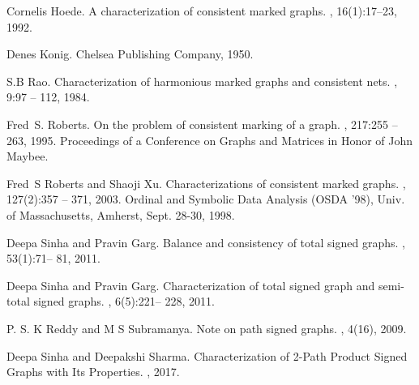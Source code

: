 \documentclass[12pt, a4paper]{report}
\theoremstyle{fordefn}
\begin{document}
\begin{thebibliography}{10}
Cornelis Hoede.
\newblock A characterization of consistent marked graphs.
, 16(1):17--23, 1992.

Denes Konig.
\newblock Chelsea Publishing Company, 1950.

S.B Rao.
\newblock Characterization of harmonious marked graphs and consistent nets.
,
  9:97 -- 112, 1984.

Fred~S. Roberts.
\newblock On the problem of consistent marking of a graph.
, 217:255 -- 263, 1995.
\newblock Proceedings of a Conference on Graphs and Matrices in Honor of John
  Maybee.

Fred~S Roberts and Shaoji Xu.
\newblock Characterizations of consistent marked graphs.
, 127(2):357 -- 371, 2003.
\newblock Ordinal and Symbolic Data Analysis (OSDA '98), Univ. of
  Massachusetts, Amherst, Sept. 28-30, 1998.

Deepa Sinha and Pravin Garg.
\newblock Balance and consistency of total signed graphs.
, 53(1):71-- 81, 2011.

Deepa Sinha and Pravin Garg.
\newblock Characterization of total signed graph and semi-total signed graphs.
,
  6(5):221-- 228, 2011.
  
P. S. K Reddy and M S Subramanya.
\newblock Note on path signed graphs.
,
  4(16), 2009.
  
Deepa Sinha and Deepakshi Sharma.
\newblock Characterization of 2-Path Product Signed Graphs with
Its Properties.
,
  2017.


\end{thebibliography}
\end{document}
